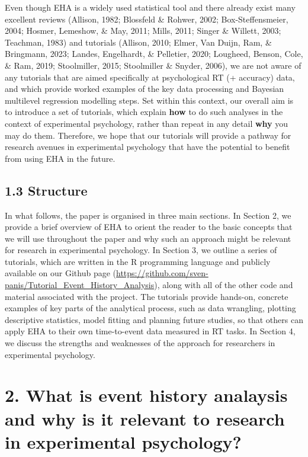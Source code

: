 \documentclass[
  man, donotrepeattitle,floatsintext]{apa6}
\begin{document}
Even though EHA is a widely used statistical tool and there already exist many excellent reviews (Allison, 1982; Blossfeld \& Rohwer, 2002; Box-Steffensmeier, 2004; Hosmer, Lemeshow, \& May, 2011; Mills, 2011; Singer \& Willett, 2003; Teachman, 1983) and tutorials (Allison, 2010; Elmer, Van Duijn, Ram, \& Bringmann, 2023; Landes, Engelhardt, \& Pelletier, 2020; Lougheed, Benson, Cole, \& Ram, 2019; Stoolmiller, 2015; Stoolmiller \& Snyder, 2006), we are not aware of any tutorials that are aimed specifically at psychological RT (+ accuracy) data, and which provide worked examples of the key data processing and Bayesian multilevel regression modelling steps. Set within this context, our overall aim is to introduce a set of tutorials, which explain \textbf{how} to do such analyses in the context of experimental psychology, rather than repeat in any detail \textbf{why} you may do them. Therefore, we hope that our tutorials will provide a pathway for research avenues in experimental psychology that have the potential to benefit from using EHA in the future.

\subsection{1.3 Structure}\label{structure}

In what follows, the paper is organised in three main sections. In Section 2, we provide a brief overview of EHA to orient the reader to the basic concepts that we will use throughout the paper and why such an approach might be relevant for research in experimental psychology. In Section 3, we outline a series of tutorials, which are written in the R programming language and publicly available on our Github page (\url{https://github.com/sven-panis/Tutorial_Event_History_Analysis}), along with all of the other code and material associated with the project. The tutorials provide hands-on, concrete examples of key parts of the analytical process, such as data wrangling, plotting descriptive statistics, model fitting and planning future studies, so that others can apply EHA to their own time-to-event data measured in RT tasks. In Section 4, we discuss the strengths and weaknesses of the approach for researchers in experimental psychology.

\section{2. What is event history analaysis and why is it relevant to research in experimental psychology?}\label{what-is-event-history-analaysis-and-why-is-it-relevant-to-research-in-experimental-psychology}
\end{document}
